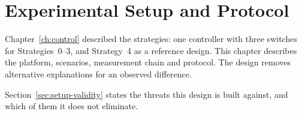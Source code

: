 %
%
%

\chapter{Experimental Setup and Protocol}
\label{ch:setup}

Chapter~\ref{ch:control} described the strategies: one controller with three switches for
Strategies~0--3, and Strategy~4 as a reference design. This chapter
describes the platform, scenarios, measurement chain and protocol. The design removes alternative
explanations for an observed difference.

Section~\ref{sec:setup-validity} states the threats this design is built against, and which of
them it does not eliminate.

